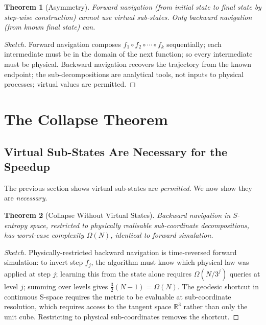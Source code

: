 \documentclass[twocolumn,11pt,a4paper]{article}
\newtheorem{theorem}{Theorem}[section]
\begin{document}
\begin{theorem}[Asymmetry]
\label{thm:asymmetry}
Forward navigation (from initial state to final state by step-wise construction) cannot use virtual sub-states. Only backward navigation (from known final state) can.
\end{theorem}

\begin{proof}[Sketch]
Forward navigation composes $f_1 \circ f_2 \circ \cdots \circ f_k$ sequentially; each intermediate must be in the domain of the next function; so every intermediate must be physical. Backward navigation recovers the trajectory from the known endpoint; the sub-decompositions are analytical tools, not inputs to physical processes; virtual values are permitted.
\end{proof}


\section{The Collapse Theorem}
\label{sec:collapse}

\subsection{Virtual Sub-States Are Necessary for the Speedup}

The previous section shows virtual sub-states are \emph{permitted}. We now show they are \emph{necessary}.

\begin{theorem}[Collapse Without Virtual States]
\label{thm:collapse}
Backward navigation in S-entropy space, restricted to physically realisable sub-coordinate decompositions, has worst-case complexity $\Omega(N)$, identical to forward simulation.
\end{theorem}

\begin{proof}[Sketch]
Physically-restricted backward navigation is time-reversed forward simulation: to invert step $f_j$, the algorithm must know which physical law was applied at step $j$; learning this from the state alone requires $\Omega(N/3^j)$ queries at level $j$; summing over levels gives $\frac{3}{2}(N-1) = \Omega(N)$. The geodesic shortcut in continuous S-space requires the metric to be evaluable at sub-coordinate resolution, which requires access to the tangent space $\mathbb{R}^3$ rather than only the unit cube. Restricting to physical sub-coordinates removes the shortcut.
\end{proof}
\end{document}
